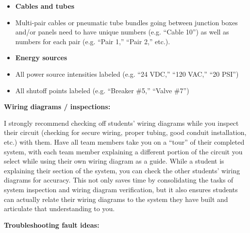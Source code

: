 \begin{itemize}
\item{} {\bf Cables and tubes}
\item{} Multi-pair cables or pneumatic tube bundles going between junction boxes and/or panels need to have unique numbers (e.g. ``Cable 10'') as well as numbers for each pair (e.g. ``Pair 1,'' ``Pair 2,'' etc.).
\end{itemize}

\begin{itemize}
\item{} {\bf Energy sources}
\item{} All power source intensities labeled (e.g. ``24 VDC,'' ``120 VAC,'' ``20 PSI'')
\item{} All shutoff points labeled (e.g. ``Breaker \#5,'' ``Valve \#7'')
\end{itemize}














\noindent
{\bf Wiring diagrams / inspections:}

I strongly recommend checking off students' wiring diagrams while you inspect their circuit (checking for secure wiring, proper tubing, good conduit installation, etc.) with them.  Have all team members take you on a ``tour'' of their completed system, with each team member explaining a different portion of the circuit you select while using their own wiring diagram as a guide.  While a student is explaining their section of the system, you can check the other students' wiring diagrams for accuracy.  This not only saves time by consolidating the tasks of system inspection and wiring diagram verification, but it also ensures students can actually relate their wiring diagrams to the system they have built and articulate that understanding to you.

\vskip 10pt

\goodbreak

\noindent
{\bf Troubleshooting fault ideas:}

